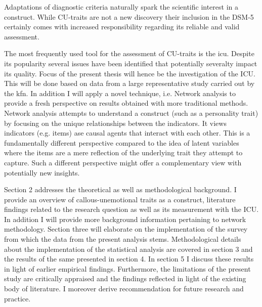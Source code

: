 Adaptations of diagnostic criteria naturally spark the scientific interest in a construct.
While CU-traits are not a new discovery their inclusion in the DSM-5 certainly comes with 
increased responsibility regarding its reliable and valid assessment.

The most frequently used tool for the assessment of CU-traits is the \gls{icu}.
Despite its popularity several issues have been identified that potentially severalty impact its quality.  
Focus of the present thesis will hence be the investigation of the ICU.
This will be done based on data from a large representative study carried out by the \gls{kfn}.
In addition I will apply a novel technique, i.e. Network analysis to provide a fresh perspective on results obtained with more traditional methods. Network analysis attempts to understand a construct (such as a personality trait) by focusing on the unique relationships between the indicators. It views indicators (e.g. items) ase causal agents that interact with each other. This is a fundamentally different perspective compared to the idea of latent variables where the items are a mere reflection of the underlying trait they attempt to capture. 
Such a different perspective might offer a complementary view with potentially new insights.

Section 2 addresses the theoretical as well as methodological background. 
I provide an overview of callous-unemotional traits as a construct, literature findings related to the research question as well as its measurement with the ICU. In addition I will provide more background information pertaining to network methodology.
Section three will elaborate on the implementation of the survey from which the data from the present analysis stems.
Methodological details about the implementation of the statistical analysis are covered in section 3 and the results of the same presented in section 4.
In section 5 I discuss these results in light of earlier empirical findings. 
Furthermore, the limitations of the present study are critically appraised and the findings reflected in light of the existing body of literature. I moreover derive recommendation for future research and practice.